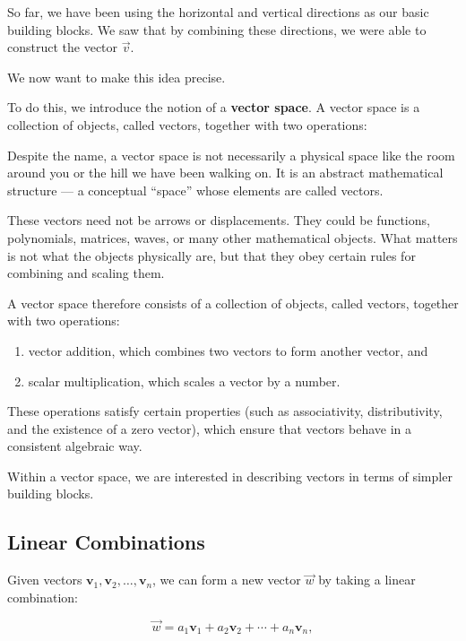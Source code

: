 \documentclass[11pt,openany]{book}
\theoremstyle{definition}
\begin{document}
So far, we have been using the horizontal and vertical directions as our basic building blocks. 
We saw that by combining these directions, we were able to construct the vector $\vec{v}$.

We now want to make this idea precise.

To do this, we introduce the notion of a \textbf{vector space}. 
A vector space is a collection of objects, called vectors, together with two operations:

\medskip

Despite the name, a vector space is not necessarily a physical space like the room 
around you or the hill we have been walking on. It is an abstract mathematical structure 
--- a conceptual ``space'' whose elements are called vectors.

\medskip

These vectors need not be arrows or displacements. They could be functions, polynomials, 
matrices, waves, or many other mathematical objects. What matters is not what the objects 
physically are, but that they obey certain rules for combining and scaling them.

\medskip

A vector space therefore consists of a collection of objects, called vectors, together 
with two operations:

\begin{enumerate}
  \item vector addition, which combines two vectors to form another vector, and
  \item scalar multiplication, which scales a vector by a number.
\end{enumerate}

These operations satisfy certain properties (such as associativity, distributivity, and the existence of a zero vector), 
which ensure that vectors behave in a consistent algebraic way.

\medskip

Within a vector space, we are interested in describing vectors in terms of simpler building blocks.

\subsection{Linear Combinations}

Given vectors $\mathbf{v}_1, \mathbf{v}_2, \dots, \mathbf{v}_n$, 
we can form a new vector $\vec{w}$ by taking a linear combination:

\[
\vec{w} = a_1 \mathbf{v}_1 + a_2 \mathbf{v}_2 + \cdots + a_n \mathbf{v}_n,
\]
\end{document}
